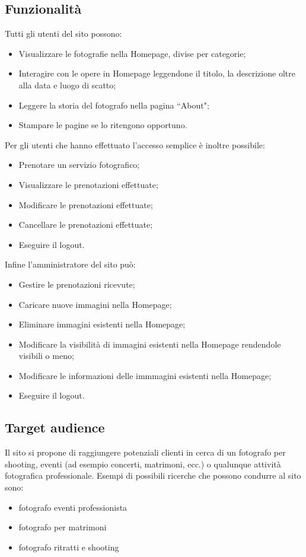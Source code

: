 \subsection{Funzionalit\`a}
Tutti gli utenti del sito possono:
\begin{itemize}
    \item Visualizzare le fotografie nella Homepage, divise per categorie;
    \item Interagire con le opere in Homepage leggendone il titolo, la descrizione oltre alla data e luogo di scatto;
    \item Leggere la storia del fotografo nella pagina ``About";
    \item Stampare le pagine se lo ritengono opportuno.
\end{itemize}
Per gli utenti che hanno effettuato l'accesso semplice \`e inoltre possibile:
\begin{itemize}
    \item Prenotare un servizio fotografico;
    \item Visualizzare le prenotazioni effettuate;
    \item Modificare le prenotazioni effettuate;
    \item Cancellare le prenotazioni effettuate;
    \item Eseguire il logout.
\end{itemize}
Infine l'amministratore del sito pu\`o:
\begin{itemize}
    \item Gestire le prenotazioni ricevute;
    \item Caricare nuove immagini nella Homepage;
    \item Eliminare immagini esistenti nella Homepage;
    \item Modificare la visibilità di immagini esistenti nella Homepage rendendole visibili o meno;
    \item Modificare le informazioni delle immmagini esistenti nella Homepage;
    \item Eseguire il logout.
\end{itemize}

\subsection{Target audience}
Il sito si propone di raggiungere potenziali clienti in cerca di  un fotografo per shooting, eventi (ad esempio concerti, matrimoni, ecc.) o qualunque attività fotografica professionale.
Esempi di possibili ricerche che possono condurre al sito sono:
\begin{itemize}
    \item fotografo eventi professionista
    \item fotografo per matrimoni
    \item fotografo ritratti e shooting
\end{itemize}